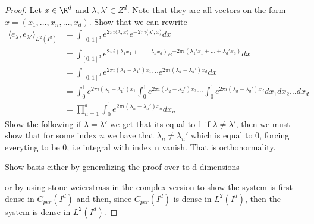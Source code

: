 \begin{proof}
    Let $x\in \R^d$ and $\lambda, \lambda' \in Z^d$. Note that they are all vectors on the form $x=(x_1,\dots, x_n, \dots, x_d)$.
    Show that we can rewrite 
    \begin{align*}
        \langle e_{\lambda},e_{\lambda'} \rangle_{L^2(I^d)} &= \int_{[0,1]^d} e^{2\pi i \langle\lambda, x\rangle} e^{-2 \pi i \langle \lambda', x\rangle} dx \\
        &= \int_{[0,1]^d} e^{2\pi i  (\lambda_1x_1 + \dots +\lambda_d x_d)} e^{-2\pi i  (\lambda_1' x_1 + \dots +\lambda_d' x_d)} dx\\
        &= \int_{[0,1]^d} e^{2\pi i  (\lambda_1 -\lambda_1')x_1} \cdots e^{2\pi i  (\lambda_d -\lambda_d')x_d} dx\\
        &= \int_0^1 e^{2\pi i  (\lambda_1- \lambda_1')x_1} \int_0^1 e^{2\pi i  (\lambda_2 - \lambda_2')x_2}  \cdots \int_0^1 e^{2\pi i  (\lambda_d - \lambda_d')x_d} dx_1 dx_2 \dots dx_d \\
        &=\prod_{n=1}^d \int_0^1 e^{2\pi i  (\lambda_n- \lambda_n')x_n} d x_n 
    \end{align*}
    Show the following 
    if $\lambda = \lambda'$ we get that its equal to 1
    if $\lambda \neq \lambda'$, then we must show that for some index $n$ we have that $\lambda_n \neq \lambda_n'$ which is equal to 0, forcing everyting to be 0, i.e integral with index n vanish.
    That is orthonormality.

    Show basis either by generalizing the proof over to d dimensions
    
    or by using stone-weierstrass in the complex version to show the system is first dense in $C_{per}(I^d)$
    and then, since $C_{per}(I^d)$ is dense in $L^2(I^d)$, then the system is dense in $L^2(I^d)$. 

\end{proof}